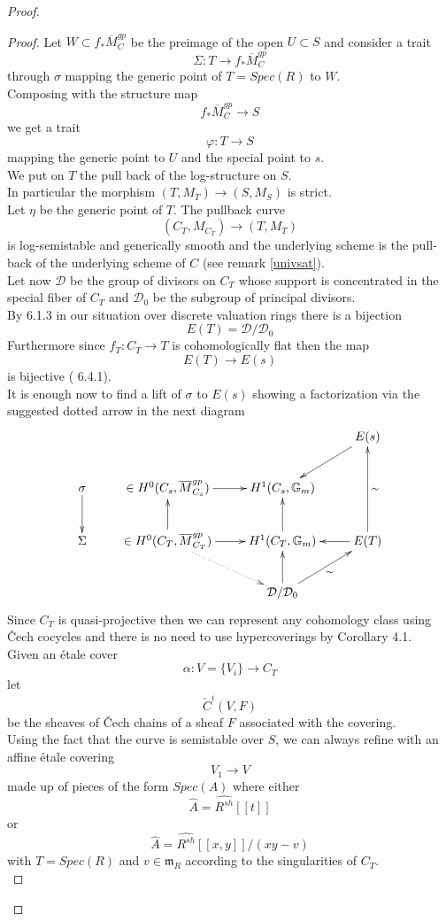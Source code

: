 \documentclass{amsart}
\theoremstyle{definition}
\numberwithin{equation}{section}
\begin{document}
\begin{proof}
\begin{proof}
\noindent Let $W\subset f_{*}\overline{M}_C^{gp}$ be the preimage of the open $U\subset S$ and consider a trait 
$$
\Sigma:T{\rightarrow} f_{*}\overline{M}_C^{gp}
$$
\noindent through $\sigma$ mapping the generic point of $T=Spec(R)$ to $W$.\\
Composing with the structure map
$$
f_{*}\overline{M}_C^{gp}{\rightarrow} S
$$
\noindent we get a trait 
$$
\varphi:T{\rightarrow} S
$$
\noindent mapping the generic point to $U$ and the special point to $s$.\\
We put on $T$ the pull back of the log-structure on $S$.\\ In particular the morphism
$(T,M_T){\rightarrow} (S,M_S)$ is strict.\\
Let $\eta$ be the generic point of $T$.
The pullback curve 
$$
(C_T,M_{C_T}){\rightarrow} (T,M_T)
$$
\noindent is log-semistable and generically smooth and the underlying scheme is the pull-back of the underlying scheme of $C$ (see remark \ref{univsat}).\\

Let now $\mathcal{D}$ be the group of divisors on $C_T$ whose support is concentrated in the special fiber of $C_T$ and $\mathcal{D}_0$ be the subgroup of principal divisors.\\

\noindent By \cite{ray} 6.1.3 in our situation over discrete valuation rings there is a bijection
$$
E(T)= \mathcal{D}/\mathcal{D}_0
$$
\noindent 
Furthermore since $f_T:C_T{\rightarrow} T$ is cohomologically flat then the map
$$
E(T){\rightarrow} E(s)
$$
\noindent is bijective (\cite{ray} 6.4.1).\\
It is enough now to find a lift of $\sigma$ to $E(s)$ showing a factorization via the suggested dotted arrow in the next diagram
$$
\xymatrix{
   & & & {E(s)}\ar[dl]\\
   {\sigma}\ar[d]  & { \in H^0(C_s,\overline{M}_{C_s}^{gp})}\ar[r] &{ H^1(C_s,\mathbb{G}_m)} &\\
   {\Sigma}  & {\in H^0(C_T,\overline{M}_{C_T}^{gp})}\ar@{.>}[dr]\ar[u] \ar[r] & {H^1(C_T,\mathbb{G}_m)}\ar[u] & \ar[l]{E(T)}\ar[uu]_{\sim}\\
   &  &  {\mathcal{D}/\mathcal{D}_0} \ar[u]\ar[ur]_{\sim}     & 
}
$$
\noindent Since $C_T$ is quasi-projective then we can represent any cohomology class using \v{C}ech cocycles and there is no need to use hypercoverings by \cite{acech} Corollary 4.1.\\
Given an \'etale cover
$$
\alpha:V=\{V_i\}{\rightarrow} C_T
$$
\noindent let
$$
\check{C}^i(V,F)
$$
\noindent be the sheaves of \v{C}ech chains of a sheaf $F$ associated with the covering. \\
Using the fact that the curve is semistable over $S$, we can always refine with an affine \'etale covering
$$
V_1{\rightarrow} V
$$
\noindent made up of pieces of the form $Spec(A)$ where either
$$
\hat{A}=\widehat{R^{sh}}[[t]]
$$
\noindent or
$$
\hat{A}=\widehat{R^{sh}}[[x,y]]/(xy-v)
$$
\noindent with $T=Spec(R)$ and $v\in \mathfrak{m}_R$ according to the singularities of $C_T$.
\\ 


\end{proof}
\end{proof}
\end{document}
